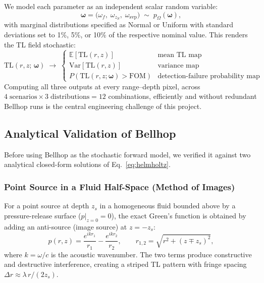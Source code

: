 \documentclass[11pt,a4paper]{article}
\begin{document}
We model each parameter as an independent scalar random variable:
\begin{equation}
  \boldsymbol{\omega}
  = \bigl(\omega_f,\;\omega_{z_S},\;\omega_\mathrm{svp}\bigr)
  \;\sim\; p_{\Omega}(\boldsymbol\omega),
  \label{eq:stochastic_params}
\end{equation}
with marginal distributions specified as Normal or Uniform with standard
deviations set to 1\%, 5\%, or 10\% of the respective nominal value.
This renders the TL field stochastic:
\begin{equation}
  \mathrm{TL}(r,z;\,\boldsymbol\omega)
  \;\longrightarrow\;
  \begin{cases}
    \mathbb{E}\!\left[\mathrm{TL}(r,z)\right] & \text{mean TL map}\\[3pt]
    \mathrm{Var}\!\left[\mathrm{TL}(r,z)\right] & \text{variance map}\\[3pt]
    P\!\left(\mathrm{TL}(r,z;\boldsymbol\omega) > \mathrm{FOM}\right)
      & \text{detection-failure probability map}
  \end{cases}
  \label{eq:uq_goal}
\end{equation}
Computing all three outputs at every range--depth pixel, across
$4\;\text{scenarios}\times3\;\text{distributions}=12$ combinations,
efficiently and without redundant Bellhop runs is the central engineering
challenge of this project.

\subsection{Analytical Validation of Bellhop}
\label{sec:validation}

Before using Bellhop as the stochastic forward model, we verified it against
two analytical closed-form solutions of Eq.~\eqref{eq:helmholtz}.

\subsubsection{Point Source in a Fluid Half-Space (Method of Images)}

For a point source at depth $z_s$ in a homogeneous fluid bounded above by a
pressure-release surface ($p|_{z=0}=0$), the exact Green's function is
obtained by adding an anti-source (image source) at $z=-z_s$:
\begin{equation}
  p(r,z) = \frac{e^{ik r_1}}{r_1} - \frac{e^{ik r_2}}{r_2},
  \qquad
  r_{1,2} = \sqrt{r^2 + (z\mp z_s)^2},
  \label{eq:method_images}
\end{equation}
where $k = \omega/c$ is the acoustic wavenumber.
The two terms produce constructive and destructive interference, creating a
striped TL pattern with fringe spacing $\Delta r \approx \lambda\,r/(2z_s)$.
\end{document}

